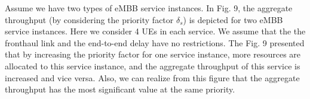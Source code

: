 \documentclass[lettersize,journal]{IEEEtran}
\begin{document}
Assume we have two types of eMBB service instances. In Fig. 9, the aggregate throughput (by considering the priority factor $\delta_s$) is depicted for two eMBB service instances. Here we consider 4 UEs in each service. We assume that the the fronthaul link and the end-to-end delay have no restrictions.
The Fig. 9 presented that by increasing the priority factor for one service instance, more resources are allocated to this service instance, and the aggregate throughput of this service is increased and vice versa. Also, we can realize from this figure that the aggregate throughput has the most significant value at the same priority.
\end{document}
